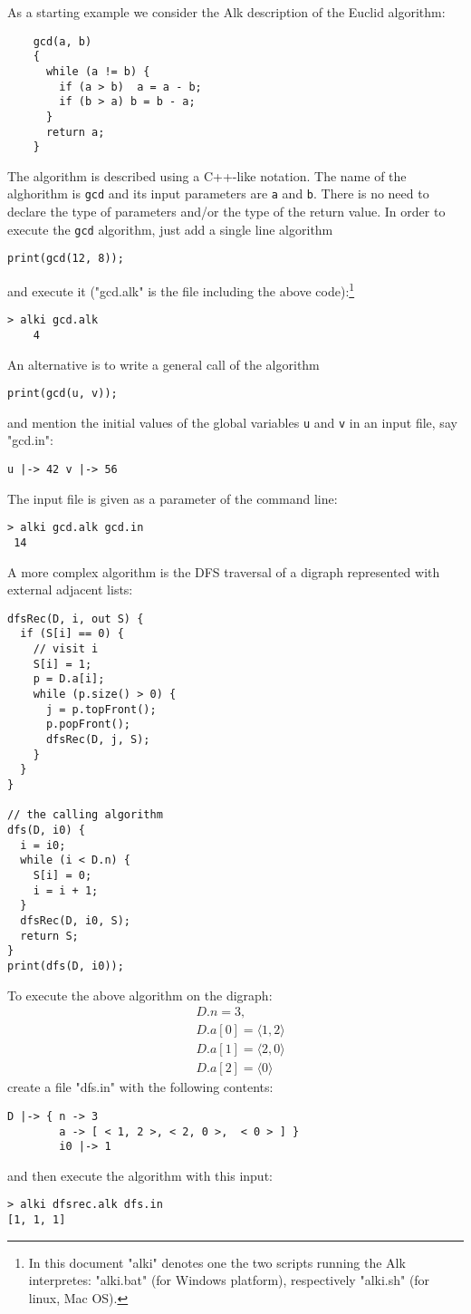 \documentclass[a4paper]{report}
\begin{document}
As a starting example we consider the Alk description of the Euclid algorithm:
\begin{verbatim}
    gcd(a, b)
    {
      while (a != b) {
        if (a > b)  a = a - b;
        if (b > a) b = b - a;
      }
      return a;
    }
\end{verbatim}
The algorithm is described using a C++-like notation. The name of the alghorithm is \texttt{gcd} and its input parameters are \texttt{a} and \texttt{b}. There is no need to declare the type of parameters and/or the type of the return value.
In order to execute the \texttt{gcd} algorithm, just add a single line algorithm 
\begin{verbatim}
print(gcd(12, 8));
\end{verbatim}
and execute it ("gcd.alk" is the file including the above code):\footnote{In this document "alki" denotes one the two scripts running the Alk interpretes: "alki.bat" (for Windows platform), respectively "alki.sh" (for linux, Mac OS).}
\begin{verbatim}
> alki gcd.alk 
    4
\end{verbatim}
An alternative is to write a general call of the algorithm
\begin{verbatim}
print(gcd(u, v));
\end{verbatim}
and mention the initial values of the global variables {\tt u} and {\tt v} in an input file, say "gcd.in":
\begin{verbatim}
u |-> 42 v |-> 56
\end{verbatim}
The input file is given as a parameter of the command line:
\begin{verbatim}
> alki gcd.alk gcd.in
 14
\end{verbatim}

A more complex algorithm is the DFS traversal of a digraph represented with external adjacent lists:
\begin{verbatim}
dfsRec(D, i, out S) {
  if (S[i] == 0) {
    // visit i
    S[i] = 1;
    p = D.a[i];
    while (p.size() > 0) {
      j = p.topFront();
      p.popFront();
      dfsRec(D, j, S);
    }
  }
}

// the calling algorithm
dfs(D, i0) {
  i = i0;
  while (i < D.n) {
    S[i] = 0;
    i = i + 1;
  }
  dfsRec(D, i0, S);
  return S;
}
print(dfs(D, i0));
\end{verbatim}
To execute the above algorithm on the digraph:
\begin{align*}
&D.n = 3,\\
&D.a[0] = \langle 1,2\rangle\\
&D.a[1] = \langle2, 0\rangle\\
&D.a[2] = \langle0\rangle
\end{align*}
create a file "dfs.in" with the following  contents:
\begin{verbatim}
D |-> { n -> 3
        a -> [ < 1, 2 >, < 2, 0 >,  < 0 > ] }
        i0 |-> 1
\end{verbatim}
and then execute the algorithm with this input:
\begin{verbatim}
> alki dfsrec.alk dfs.in
[1, 1, 1]
\end{verbatim}
\end{document}
